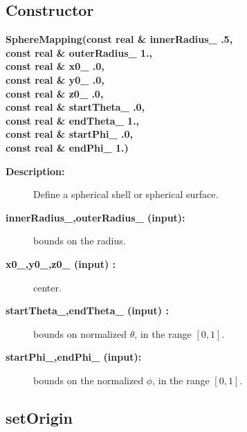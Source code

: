 \subsection{Constructor}
 
\newlength{\SphereMappingIncludeArgIndent}
\begin{flushleft} \textbf{%
\settowidth{\SphereMappingIncludeArgIndent}{SphereMapping(}%
SphereMapping(const real \& innerRadius\_  .5, \\ 
\hspace{\SphereMappingIncludeArgIndent}const real \& outerRadius\_  1., \\ 
\hspace{\SphereMappingIncludeArgIndent}const real \& x0\_  .0, \\ 
\hspace{\SphereMappingIncludeArgIndent}const real \& y0\_  .0, \\ 
\hspace{\SphereMappingIncludeArgIndent}const real \& z0\_  .0,\\ 
\hspace{\SphereMappingIncludeArgIndent}const real \& startTheta\_  .0,\\ 
\hspace{\SphereMappingIncludeArgIndent}const real \& endTheta\_  1.,\\ 
\hspace{\SphereMappingIncludeArgIndent}const real \& startPhi\_  .0,\\ 
\hspace{\SphereMappingIncludeArgIndent}const real \& endPhi\_  1.)
}\end{flushleft}
\begin{description}
\item[{\bf Description:}]  
     Define a spherical shell or spherical surface.
\item[{\bf innerRadius\_,outerRadius\_ (input):}]  bounds on the radius.
\item[{\bf x0\_,y0\_,z0\_ (input) :}]  center.
\item[{\bf startTheta\_,endTheta\_ (input) :}]  bounds on normalized $\theta$, in the range $[0,1]$.
\item[{\bf startPhi\_,endPhi\_ (input):}]  bounds on the normalized $\phi$, in the range $[0,1]$.
\end{description}
\subsection{setOrigin}
 

